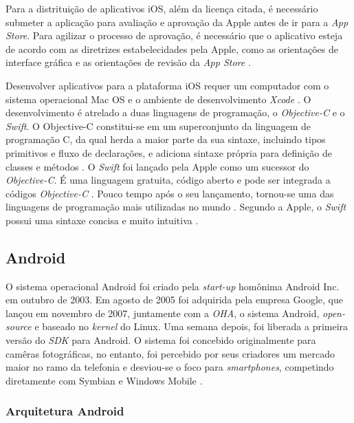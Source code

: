 Para a distrituição de aplicativos iOS, além da licença citada, é necessário submeter a aplicação para avaliação e aprovação da Apple antes de ir para a \textit{App Store}. 
Para agilizar o processo de aprovação, é necessário que o aplicativo esteja de acordo com as diretrizes estabelecidades pela Apple, como as orientações de interface gráfica e as orientações de revisão da \textit{App Store} \cite{apple_inc_submitting_2016}.

Desenvolver aplicativos para a plataforma iOS requer um computador com o sistema operacional Mac OS e o ambiente de desenvolvimento \textit{Xcode} \cite{heitkotter_evaluating_2013}. 
O desenvolvimento é atrelado a duas linguagens de programação, o \textit{Objective-C} e o \textit{Swift}.
O Objective-C constitui-se em um superconjunto da linguagem de programação C, da qual herda a maior parte da sua sintaxe, incluindo tipos primitivos e fluxo de declarações, e adiciona sintaxe própria para definição de classes e métodos \cite{apple_inc_about_2014}. 
O \textit{Swift} foi lançado pela Apple como um sucessor do \textit{Objective-C}. É uma linguagem gratuita, código aberto e pode ser integrada a códigos \textit{Objective-C} \cite{apple_inc_swift_2016}. Pouco tempo após o seu lançamento, tornou-se uma das linguagens de programação mais utilizadas no mundo \cite{rebouas_empirical_2016}. Segundo a Apple, o \textit{Swift} possui uma sintaxe concisa e muito intuitiva \cite{apple_inc_swift_2016}.

\subsection{Android} \label{subsection:android}

O sistema operacional Android foi criado pela \textit{start-up} homônima Android Inc. em outubro de 2003. Em agosto de 2005 foi adquirida pela empresa Google, que lançou
em novembro de 2007, juntamente com a \textit{OHA}, o sistema Android, \textit{open-source} e baseado no \textit{kernel} do Linux. Uma semana depois, foi liberada a primeira versão do \textit{SDK} para Android.
O sistema foi concebido originalmente para camêras fotográficas, no entanto, foi percebido por seus criadores um mercado maior no ramo da telefonia e desviou-se o 
foco para \textit{smartphones}, competindo diretamente com Symbian e Windows Mobile \cite{papajorgji_automated_2015}.

\subsubsection{Arquitetura Android} \label{subsection:arc-android}

